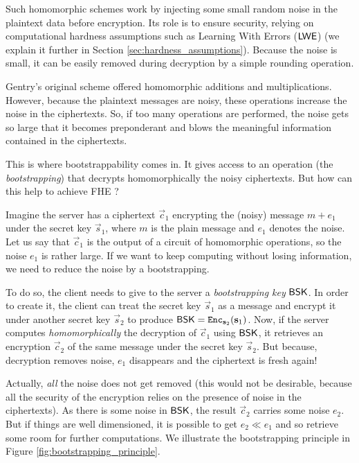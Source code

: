 Such homomorphic schemes work by injecting some small random noise in the plaintext data before encryption. Its role is to ensure security, relying on computational hardness assumptions such as Learning With Errors ($\textsf{LWE}$) (we explain it further in Section \ref{sec:hardness_assumptions}). Because the noise is small, it can be easily removed during decryption by a simple rounding operation. 

Gentry's original scheme offered homomorphic additions and multiplications. However, because the plaintext messages are noisy, these operations increase the noise in the ciphertexts. So, if too many operations are performed, the noise gets so large that it becomes preponderant and blows the meaningful information contained in the ciphertexts.

This is where bootstrappability comes in. It gives access to an operation (the \textit{bootstrapping}) that decrypts homomorphically the noisy ciphertexts. But how can this help to achieve FHE ?

Imagine the server has a ciphertext $\vec c_1$ encrypting the (noisy) message $m +e_1$ under the secret key $\vec s_1$, where $m$ is the plain message and $e_1$ denotes the noise. Let us say that $\vec c_1$ is the output of a circuit of homomorphic operations, so the noise $e_1$ is rather large. If we want to keep computing without losing information, we need to reduce the noise by a bootstrapping. 

To do so, the client needs to give to the server a \textit{bootstrapping key} $\textsf{BSK}$. In order to create it, the client can treat the secret key $\vec s_1$ as a message and encrypt it under another secret key $\vec s_2$ to produce $\textsf{BSK} = \texttt{Enc}_{\mathbf s_2}(\mathbf s_1)$. Now, if the server computes \textit{homomorphically} the decryption of $\vec c_1$ using $\textsf{BSK}$, it retrieves an encryption $\vec c_2$ of the same message under the secret key $\vec s_2$. But because, decryption removes noise, $e_1$ disappears and the ciphertext is fresh again!

Actually, \textit{all} the noise does not get removed (this would not be desirable, because all the security of the encryption relies on the presence of noise in the ciphertexts). As there is some noise in $\textsf{BSK}$, the result $\vec c_2$ carries some noise $e_2$. But if things are well dimensioned, it is possible to get $e_2 \ll e_1$ and so retrieve some room for further computations. We illustrate the bootstrapping principle in Figure \ref{fig:bootstrapping_principle}.


